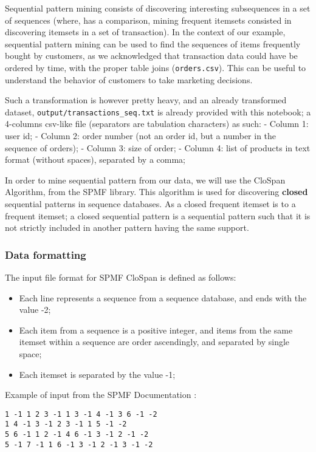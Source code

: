 \documentclass[11pt]{article}
\providecommand{\tightlist}{%
      \setlength{\itemsep}{0pt}\setlength{\parskip}{0pt}}
\begin{document}
Sequential pattern mining consists of discovering interesting
subsequences in a set of sequences (where, has a comparison, mining
frequent itemsets consisted in discovering itemsets in a set of
transaction). In the context of our example, sequential pattern mining
can be used to find the sequences of items frequently bought by
customers, as we acknowledged that transaction data could have be
ordered by time, with the proper table joins (\texttt{orders.csv}). This
can be useful to understand the behavior of customers to take marketing
decisions.

Such a transformation is however pretty heavy, and an already
transformed dataset, \texttt{output/transactions\_seq.txt} is already
provided with this notebook; a 4-columns csv-like file (separators are
tabulation characters) as such: - Column 1: user id; - Column 2: order
number (not an order id, but a number in the sequence of orders); -
Column 3: size of order; - Column 4: list of products in text format
(without spaces), separated by a comma;

In order to mine sequential pattern from our data, we will use the
CloSpan Algorithm, from the SPMF library. This algorithm is used for
discovering \textbf{closed} sequential patterns in sequence databases.
As a closed frequent itemset is to a frequent itemset; a closed
sequential pattern is a sequential pattern such that it is not strictly
included in another pattern having the same support.

\hypertarget{data-formatting}{%
\subsubsection{Data formatting}\label{data-formatting}}

The input file format for SPMF CloSpan is defined as follows:

\begin{itemize}
\tightlist
\item
  Each line represents a sequence from a sequence database, and ends
  with the value -2;
\item
  Each item from a sequence is a positive integer, and items from the
  same itemset within a sequence are order ascendingly, and separated by
  single space;
\item
  Each itemset is separated by the value -1;
\end{itemize}

Example of input from the SPMF Documentation :

\begin{verbatim}
1 -1 1 2 3 -1 1 3 -1 4 -1 3 6 -1 -2
1 4 -1 3 -1 2 3 -1 1 5 -1 -2
5 6 -1 1 2 -1 4 6 -1 3 -1 2 -1 -2
5 -1 7 -1 1 6 -1 3 -1 2 -1 3 -1 -2
\end{verbatim}
\end{document}
